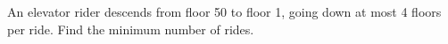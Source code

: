 An elevator rider descends from floor 50 to floor 1, going down at most 4 floors per ride. Find the minimum number of rides.
